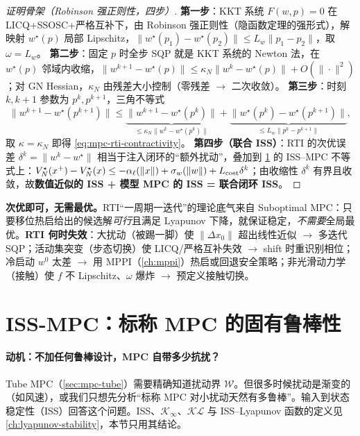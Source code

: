 \begin{proof}[证明骨架（Robinson 强正则性，四步）]
\textbf{第一步}：KKT 系统 $F(w,p)=0$ 在 LICQ+SSOSC+严格互补下，由 Robinson 强正则性（隐函数定理的强形式），解映射 $w^\star(p)$ 局部 Lipschitz，$\|w^\star(p_1)-w^\star(p_2)\|\le L_w\|p_1-p_2\|$，取 $\omega=L_w$。
\textbf{第二步}：固定 $p$ 时全步 SQP 就是 KKT 系统的 Newton 法，在 $w^\star(p)$ 邻域内收缩，$\|w^{k+1}-w^\star(p)\|\le\kappa_N\|w^k-w^\star(p)\|+O(\|\cdot\|^2)$；对 GN Hessian，$\kappa_N$ 由残差大小控制（零残差 $\to$ 二次收敛）。
\textbf{第三步}：时刻 $k,k+1$ 参数为 $p^k,p^{k+1}$，三角不等式
\[
  \|w^{k+1}-w^\star(p^{k+1})\|\le\underbrace{\|w^{k+1}-w^\star(p^k)\|}_{\le\kappa_N\|w^k-w^\star(p^k)\|}+\underbrace{\|w^\star(p^k)-w^\star(p^{k+1})\|}_{\le L_w\|p^k-p^{k+1}\|},
\]
取 $\kappa=\kappa_N$ 即得 \cref{eq:mpc-rti-contractivity}。
\textbf{第四步（联合 ISS）}：RTI 的次优误差 $\delta^k=\|w^k-w^\star\|$ 相当于注入闭环的“额外扰动”，叠加到 \cref{sec:mpc-iss} 的 ISS--MPC 不等式上：$V_N^\star(x^+)-V_N^\star(x)\le-\alpha_\ell(\|x\|)+\sigma_w(\|w\|)+L_{\rm cost}\delta^k$；由收缩性 $\delta^k$ 有界且收敛，故\textbf{数值近似的 ISS + 模型 MPC 的 ISS = 联合闭环 ISS}。
\end{proof}

\begin{remark}
\textbf{次优即可，无需最优。}\;RTI“一周期一迭代”的理论底气来自 Suboptimal MPC\cite{scokaert1999suboptimal}：只要移位热启给出的候选解\emph{可行}且满足 Lyapunov 下降，就保证稳定，\emph{不需要}全局最优。\textbf{RTI 何时失效}：大扰动（被踢一脚）使 $\|\Delta x_0\|$ 超出线性近似 $\to$ 多迭代 SQP；活动集突变（步态切换）使 LICQ/严格互补失效 $\to$ shift 时重识别相位；冷启动 $w^0$ 太差 $\to$ 用 MPPI（\cref{ch:mppi}）热启或回退安全策略；非光滑动力学（接触）使 $f$ 不 Lipschitz、$\omega$ 爆炸 $\to$ 预定义接触切换。
\end{remark}

\section{ISS-MPC：标称 MPC 的固有鲁棒性}
\label{sec:mpc-iss}

\paragraph{动机：不加任何鲁棒设计，MPC 自带多少抗扰？}
Tube MPC（\cref{sec:mpc-tube}）需要精确知道扰动界 $\mathcal W$。但很多时候扰动是渐变的（如风速），或我们只想先分析“标称 MPC 对小扰动天然有多鲁棒”。输入到状态稳定性（ISS）回答这个问题。ISS、$\mathcal K_\infty$、$\mathcal{KL}$ 与 ISS--Lyapunov 函数的定义见 \cref{ch:lyapunov-stability}，本节只用其结论。


